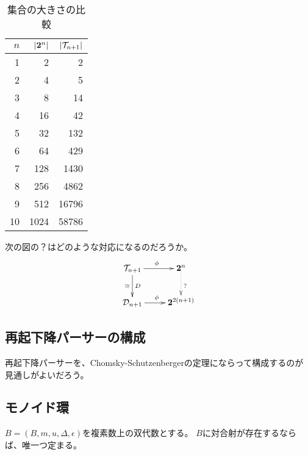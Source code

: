 {\begin{table}[!htpd]\begin{center}\begin{tabular}{rrr}\hline
$n$ & $|{\mathbf{2}}^n|$ & $|{{\mathcal{T}}}_{n+1}|$ \\\hline
1 & 2 & 2 \\ 
2 & 4 & 5 \\ 
3 & 8 & 14 \\ 
4 & 16 & 42 \\ 
5 & 32 & 132 \\ 
6 & 64 & 429 \\ 
7 & 128 & 1430 \\ 
8 & 256 & 4862 \\ 
9 & 512 & 16796 \\ 
10 & 1024 & 58786 \\ 
\hline\end{tabular}\end{center}
\caption{集合の大きさの比較}\label{table:集合の大きさの比較}
\end{table}
	次の図の？はどのような対応になるのだろうか。
	\begin{equation*}\xymatrix{
		\T_{n+1} \ar[r]^\phi \ar[d]^D_\simeq & \mybf{2}^n \ar@{.>}[d]^{?} \\
		\D_{n+1} \ar[r]^\phi & \mybf{2}^{2(n+1)} \\
	}\end{equation*}
\subsection{再起下降パーサーの構成}\label{s2:再起下降パーサーの構成} %
	再起下降パーサーを、Chomsky-Schutzenbergerの定理にならって構成するのが
	見通しがよいだろう。
\subsection{モノイド環}\label{s2:モノイド環} %
	\begin{proposition}[対合射の一意性]\label{prop:対合射の一意性} %
		$B=(B,m,u,\Delta,\epsilon)$を複素数上の双代数とする。
		$B$に対合射が存在するならば、唯一つ定まる。
	\end{proposition} %

}
